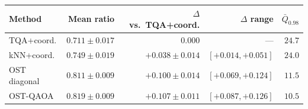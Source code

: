 \begin{tabular}{lrrrr}
\toprule
Method & Mean ratio & $\Delta$ vs.\ TQA+coord. & $\Delta$ range & $\bar{Q}_{0.98}$ \\
\midrule
TQA+coord. & $0.711\pm0.017$ & $0.000$ & --- & $24.7$ \\
kNN+coord. & $0.749\pm0.019$ & $+0.038\pm0.014$ & $[+0.014, +0.051]$ & $24.0$ \\
OST diagonal & $0.811\pm0.009$ & $+0.100\pm0.014$ & $[+0.069, +0.124]$ & $11.5$ \\
OST-QAOA & $0.819\pm0.009$ & $+0.107\pm0.011$ & $[+0.087, +0.126]$ & $10.5$ \\
\bottomrule
\end{tabular}
